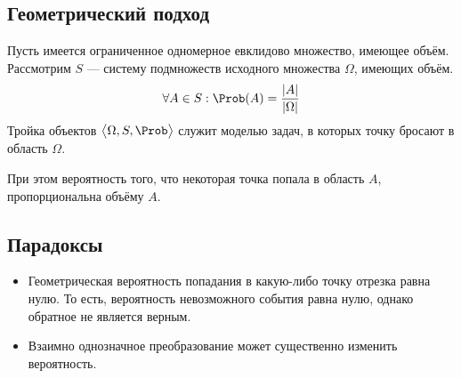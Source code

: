 \subsection{Геометрический подход}
Пусть имеется ограниченное одномерное евклидово множество, имеющее объём. \\
Рассмотрим $S$ --- систему подмножеств исходного множества $\Omega$, имеющих объём.
\[
	\forall A \in S:  \Prob(A) = \frac{|A|}{|\Omega|}
\]
Тройка объектов $ \big<\Omega, S, \Prob\big> $ служит моделью задач, в которых точку бросают в область $\Omega$.
\smallskip

При этом вероятность того, что некоторая точка попала в область $A$, пропорциональна объёму $A$.
\subsection{Парадоксы}
\begin{itemize}
	\item Геометрическая вероятность попадания в какую-либо точку отрезка равна нулю.
	      То есть, вероятность невозможного события равна нулю, однако обратное не является верным.
	\item Взаимно однозначное преобразование может существенно изменить вероятность.
\end{itemize}
